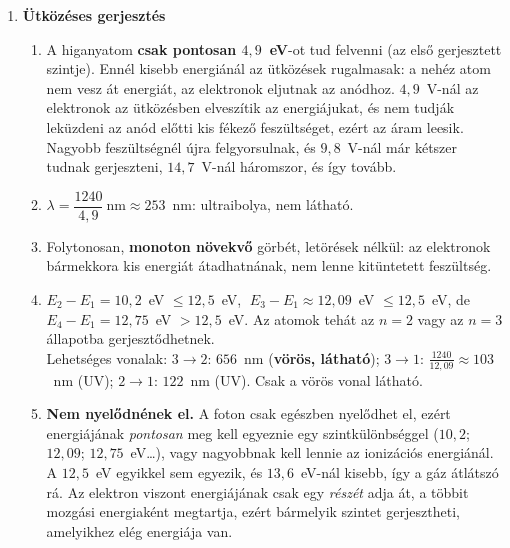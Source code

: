 \documentclass[11pt,a4paper]{article}
\begin{document}
\begin{enumerate}
\item \textbf{Ütközéses gerjesztés}
  \begin{enumerate}
    \item A higanyatom \textbf{csak pontosan $4{,}9$~eV}-ot tud felvenni (az első gerjesztett
      szintje). Ennél kisebb energiánál az ütközések rugalmasak: a nehéz atom nem vesz át
      energiát, az elektronok eljutnak az anódhoz. $4{,}9$~V-nál az elektronok az
      ütközésben elveszítik az energiájukat, és nem tudják leküzdeni az anód előtti kis
      fékező feszültséget, ezért az áram leesik. Nagyobb feszültségnél újra
      felgyorsulnak, és $9{,}8$~V-nál már kétszer tudnak gerjeszteni, $14{,}7$~V-nál
      háromszor, és így tovább.
    \item $\lambda = \dfrac{1240}{4{,}9}~\text{nm} \approx 253$~nm: ultraibolya, nem látható.
    \item Folytonosan, \textbf{monoton növekvő} görbét, letörések nélkül: az elektronok
      bármekkora kis energiát átadhatnának, nem lenne kitüntetett feszültség.
    \item $E_2 - E_1 = 10{,}2$~eV $\le 12{,}5$~eV, $\;E_3 - E_1 \approx 12{,}09$~eV $\le
      12{,}5$~eV, de $E_4 - E_1 = 12{,}75$~eV $> 12{,}5$~eV. Az atomok tehát az $n=2$ vagy
      az $n=3$ állapotba gerjesztődhetnek.\\
      Lehetséges vonalak: $3\to2$: $656$~nm (\textbf{vörös, látható});
      $3\to1$: $\tfrac{1240}{12{,}09} \approx 103$~nm (UV); $2\to1$: $122$~nm (UV).
      Csak a vörös vonal látható.
    \item \textbf{Nem nyelődnének el.} A foton csak egészben nyelődhet el, ezért energiájának
      \emph{pontosan} meg kell egyeznie egy szintkülönbséggel ($10{,}2$; $12{,}09$;
      $12{,}75$~eV\dots), vagy nagyobbnak kell lennie az ionizációs energiánál. A $12{,}5$~eV
      egyikkel sem egyezik, és $13{,}6$~eV-nál kisebb, így a gáz átlátszó rá. Az elektron
      viszont energiájának csak egy \emph{részét} adja át, a többit mozgási energiaként
      megtartja, ezért bármelyik szintet gerjesztheti, amelyikhez elég energiája van.
  \end{enumerate}


\end{enumerate}
\end{document}
